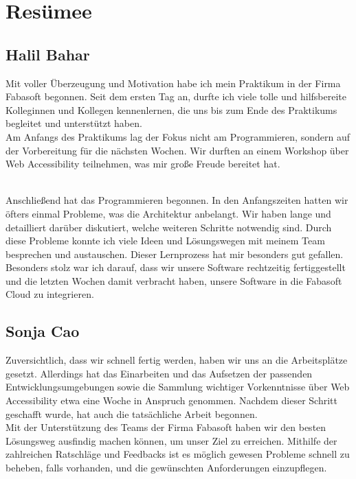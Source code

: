 \chapter{Resümee}
\section{Halil Bahar}
Mit voller Überzeugung und Motivation habe ich mein Praktikum in der Firma Fabasoft begonnen. Seit dem ersten Tag an, durfte ich viele tolle und hilfsbereite Kolleginnen und Kollegen kennenlernen, die uns bis zum Ende des Praktikums begleitet und unterstützt haben.\\
Am Anfangs des Praktikums lag der Fokus nicht am Programmieren, sondern auf der Vorbereitung für die nächsten Wochen. Wir durften an einem Workshop über Web Accessibility teilnehmen, was mir große Freude bereitet hat.

\mbox{}\\
Anschließend hat das Programmieren begonnen. In den Anfangszeiten hatten wir öfters einmal Probleme, was die Architektur anbelangt. Wir haben lange und detailliert darüber diskutiert, welche weiteren Schritte notwendig sind. Durch diese Probleme konnte ich viele Ideen und Lösungswegen mit meinem Team besprechen und austauschen. Dieser Lernprozess hat mir besonders gut gefallen.\\
Besonders stolz war ich darauf, dass wir unsere Software rechtzeitig fertiggestellt und die letzten Wochen damit verbracht haben, unsere Software in die Fabasoft Cloud zu integrieren.


\section{Sonja Cao}
Zuversichtlich, dass wir schnell fertig werden, haben wir uns an die Arbeitsplätze gesetzt. Allerdings hat das Einarbeiten und das Aufsetzen der passenden Entwicklungsumgebungen sowie die Sammlung wichtiger Vorkenntnisse über Web Accessibility etwa eine Woche in Anspruch genommen. Nachdem dieser Schritt geschafft wurde, hat auch die tatsächliche Arbeit begonnen. \\
Mit der Unterstützung des Teams der Firma Fabasoft haben wir den besten Lösungsweg ausfindig machen können, um unser Ziel zu erreichen. Mithilfe der zahlreichen Ratschläge und Feedbacks ist es möglich gewesen Probleme schnell zu beheben, falls vorhanden, und die gewünschten Anforderungen einzupflegen. 

